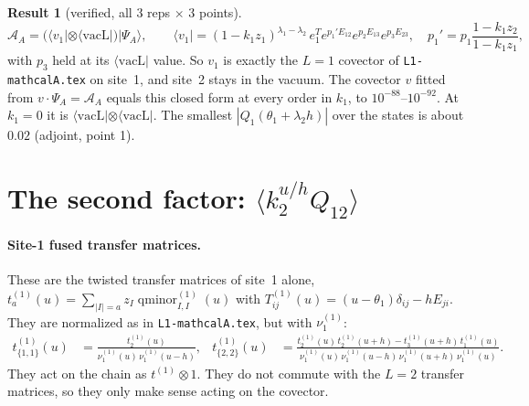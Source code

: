\documentclass[11pt]{article}
\newcommand{\vacL}{\langle\mathrm{vacL}|}
\newcommand{\qmin}{\operatorname{qminor}}
\newcommand{\nb}[1]{\texttt{#1}}
\theoremstyle{definition}
\newtheorem{result}{Result}
\theoremstyle{remark}
\begin{document}
\begin{result}[verified, all 3 reps $\times$ 3 points]\label{res:first}
\begin{equation}
\mathcal A_A=\big(\langle v_1|\otimes\vacL\big)|\Psi_A\rangle,\qquad
\langle v_1|=(1-k_1z_1)^{\lambda_1-\lambda_2}\,e_1^Te^{p_1'E_{12}}e^{p_2E_{13}}e^{p_3E_{23}},\quad p_1'=p_1\frac{1-k_1z_2}{1-k_1z_1},
\end{equation}
with $p_3$ held at its $\vacL$ value. So $v_1$ is exactly the $L=1$ covector of \nb{L1-mathcalA.tex} on site~1, and site~2 stays in the vacuum. The covector $v$ fitted from $v\cdot\Psi_A=\mathcal A_A$ equals this closed form at every order in $k_1$, to $10^{-88}$--$10^{-92}$. At $k_1=0$ it is $\vacL\otimes\vacL$. The smallest $|Q_1(\theta_1+\lambda_2h)|$ over the states is about $0.02$ (adjoint, point 1).
\end{result}

\section{The second factor: $\langle k_2^{u/h}Q_{12}\rangle$}\label{sec:second}

\paragraph{Site-1 fused transfer matrices.}
These are the twisted transfer matrices of site~1 alone, $t^{(1)}_a(u)=\sum_{|I|=a}z_I\qmin^{(1)}_{I,I}(u)$ with $T^{(1)}_{ij}(u)=(u-\theta_1)\delta_{ij}-hE_{ji}$. They are normalized as in \nb{L1-mathcalA.tex}, but with $\nu^{(1)}_1$:
\begin{align}
t^{(1)}_{\{1,1\}}(u)&=\frac{t^{(1)}_2(u)}{\nu^{(1)}_1(u)\,\nu^{(1)}_1(u-h)},&
t^{(1)}_{\{2,2\}}(u)&=\frac{t^{(1)}_2(u)\,t^{(1)}_2(u+h)-t^{(1)}_3(u+h)\,t^{(1)}_1(u)}{\nu^{(1)}_1(u)\,\nu^{(1)}_1(u-h)\,\nu^{(1)}_1(u+h)\,\nu^{(1)}_1(u)} .
\end{align}
They act on the chain as $t^{(1)}\otimes1$. They do not commute with the $L=2$ transfer matrices, so they only make sense acting on the covector.
\end{document}
